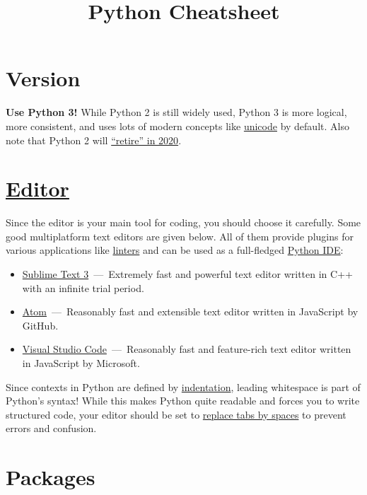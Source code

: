 \documentclass[rules]{cheatsheet}
\begin{document}
\title{Python Cheatsheet}

\section{Version}

\textbf{Use Python 3!} While Python 2 is still widely used, Python 3 is more logical, more consistent, and uses lots of modern concepts like \href{https://docs.python.org/3/howto/unicode.html}{unicode} by default. Also note that Python 2 will \href{https://legacy.python.org/dev/peps/pep-0373/}{\enquote{retire} in 2020}.

\section{\href{https://wiki.python.org/moin/PythonEditors}{Editor}}

Since the editor is your main tool for coding, you should choose it carefully. Some good multiplatform text editors are given below. All of them provide plugins for various applications like \href{https://realpython.com/python-code-quality/#linters}{linters} and can be used as a full-fledged \href{https://realpython.com/python-ides-code-editors-guide/}{Python IDE}:
\begin{itemize}
  \item \href{http://www.sublimetext.com/}%
    {Sublime Text 3}~---~Extremely fast and powerful text editor written in C++ with an infinite trial period.
  \item \href{https://atom.io/}%
    {Atom}~---~Reasonably fast and extensible text editor written in JavaScript by GitHub.
  \item \href{https://code.visualstudio.com/}%
    {Visual Studio Code}~---~Reasonably fast and feature-rich text editor written in JavaScript by Microsoft.
\end{itemize}

Since contexts in Python are defined by \href{https://docs.python.org/2.0/ref/indentation.html}{indentation}, leading whitespace is part of Python's syntax! While this makes Python quite readable and forces you to write structured code, your editor should be set to \href{https://www.python.org/dev/peps/pep-0008/#tabs-or-spaces}{replace tabs by spaces} to prevent errors and confusion.

\section{Packages}
\end{document}

